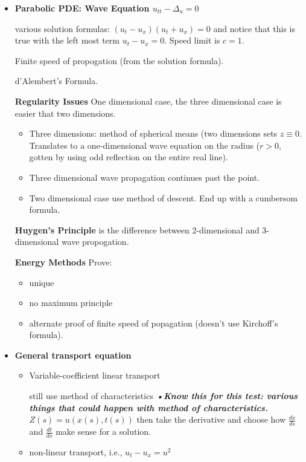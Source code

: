\documentclass[12pt,a4paper]{report}
\begin{document}
{\begin{description}
\begin{itemize}
	\item \textbf{Parabolic PDE: Wave Equation $u_{tt}-\Delta_u=0$}
	
	various solution formulas: $(u_t-u_x)(u_t+u_x)=0$ and notice that this is true with the left most term $u_t-u_x=0$.  Speed limit is $c=1$.
	
	Finite speed of propogation (from the solution formula).
	
	d'Alembert's Formula.
	
	\textbf{Regularity Issues} One dimensional case, the three dimensional case is easier that two dimensions.

	\begin{itemize}
	\item	Three dimensions: method of spherical means (two dimensions sets $z\equiv 0$.  Translates to a one-dimensional wave equation on the radius ($r>0$, gotten by using odd reflection on the entire real line).
	
	\item Three dimensional wave propagation continues past the point.
	
	\item Two dimensional case use method of descent.  End up with a cumbersom formula.
	
\end{itemize}		
	
	\textbf{Huygen's Principle} is the difference between 2-dimensional and 3-dimensional wave propogation.
	
	\textbf{Energy Methods} Prove:
	\begin{itemize}
		\item unique
		\item no maximum principle
		\item alternate proof of finite speed of popagation (doesn't use Kirchoff's formula).
	\end{itemize}
		
	\item \textbf{General transport equation}
	\begin{itemize}
		\item Variable-coefficient linear transport
		
		still use method of characteristics \textbf{\textit{•Know this for this test: various things that could happen with method of characteristics.}} $Z(s)=u(x(s), t(s))$ then take the derivative and choose how $\frac{dx}{ds}$ and $\frac{dt}{ds}$ make sense for a solution.
		
		\item non-linear transport, i.e., $u_t-u_x=u^2$
		

\end{itemize}
\end{itemize}
\end{description}}
\end{document}

